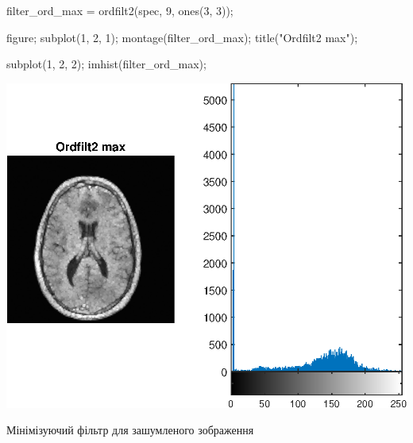 \documentclass[12pt]{article}
\begin{document}
\begin{matlabcode}
filter_ord_max = ordfilt2(spec, 9, ones(3, 3));

figure;
subplot(1, 2, 1);
montage(filter_ord_max);
title("Ordfilt2 max");

subplot(1, 2, 2);
imhist(filter_ord_max);
\end{matlabcode}
\begin{center}
\includegraphics[width=\maxwidth{56.196688409433015em}]{figure_8}
\end{center}

\begin{par}
\begin{flushleft}
Мінімізуючий фільтр для зашумленого зображення
\end{flushleft}
\end{par}
\end{document}
